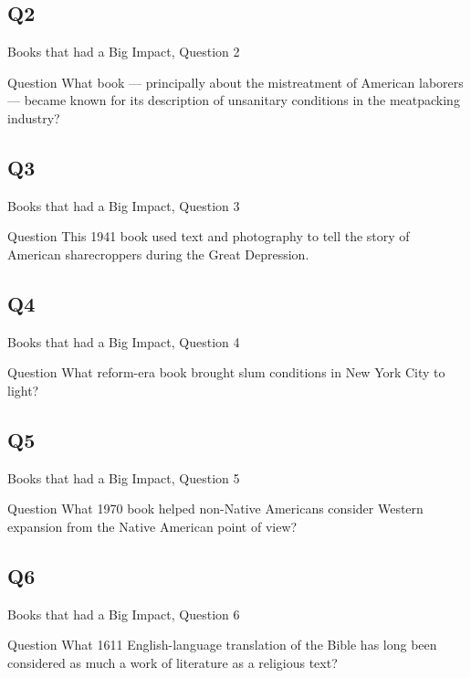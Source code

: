 \documentclass[11pt]{beamer}
\begin{document}
\subsection*{Q2}
\begin{frame}[t]{Books that had a Big Impact, Question 2}
\begin{block}{Question}
What book --- principally about the mistreatment of  American laborers --- became known for its description of unsanitary conditions in the meatpacking industry?
\end{block}
\end{frame}
\subsection*{Q3}
\begin{frame}[t]{Books that had a Big Impact, Question 3}
\begin{block}{Question}
This 1941 book used text and photography to tell the story of American sharecroppers during the Great Depression.
\end{block}
\end{frame}
\subsection*{Q4}
\begin{frame}[t]{Books that had a Big Impact, Question 4}
\begin{block}{Question}
What reform-era book brought slum conditions in New York City to light?
\end{block}
\end{frame}
\subsection*{Q5}
\begin{frame}[t]{Books that had a Big Impact, Question 5}
\begin{block}{Question}
What 1970 book helped non-Native Americans consider Western expansion from the Native American point of view?
\end{block}
\end{frame}
\subsection*{Q6}
\begin{frame}[t]{Books that had a Big Impact, Question 6}
\begin{block}{Question}
What 1611 English-language translation of the Bible has long been considered as much a work of literature as a religious text?
\end{block}
\end{frame}
\end{document}
